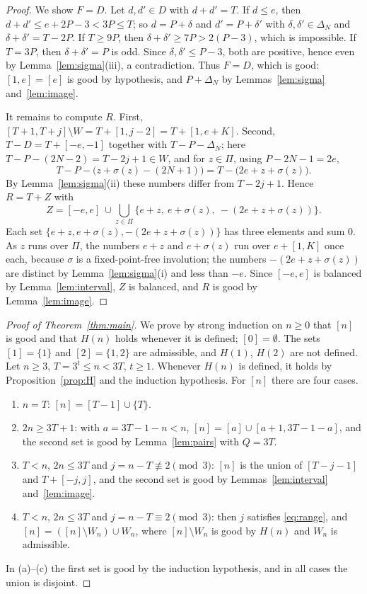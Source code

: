 \documentclass[preprint,12pt]{elsarticle}
\theoremstyle{definition}
\newcommand{\iv}[2]{[#1,#2]}
\begin{document}
\begin{proof}
We show $F=D$. Let $d,d'\in D$ with $d+d'=T$. If $d\le e$, then $d+d'\le e+2P-3<3P\le T$; so $d=P+\delta$ and $d'=P+\delta'$ with $\delta,\delta'\in\Delta_N$ and $\delta+\delta'=T-2P$. If $T\ge9P$, then $\delta+\delta'\ge7P>2(P-3)$, which is impossible. If $T=3P$, then $\delta+\delta'=P$ is odd. Since $\delta,\delta'\le P-3$, both are positive, hence even by Lemma~\ref{lem:sigma}(iii), a contradiction. Thus $F=D$, which is good: $\iv1e=[e]$ is good by hypothesis, and $P+\Delta_N$ by Lemmas~\ref{lem:sigma} and~\ref{lem:image}.

It remains to compute $R$. First, $\iv{T+1}{T+j}\setminus W=T+\iv1{j-2}=T+\iv1{e+K}$. Second, $T-D=T+\iv{-e}{-1}$ together with $T-P-\Delta_N$; here $T-P-(2N-2)=T-2j+1\in W$, and for $z\in\Pi$, using $P-2N-1=2e$,
\[
T-P-\bigl(z+\sigma(z)-(2N+1)\bigr)=T-\bigl(2e+z+\sigma(z)\bigr).
\]
By Lemma~\ref{lem:sigma}(ii) these numbers differ from $T-2j+1$. Hence $R=T+Z$ with
\[
Z=\iv{-e}{e}\ \cup\bigcup_{z\in\Pi}\bigl\{e+z,\ e+\sigma(z),\ -(2e+z+\sigma(z))\bigr\}.
\]
Each set $\{e+z,e+\sigma(z),-(2e+z+\sigma(z))\}$ has three elements and sum $0$. As $z$ runs over $\Pi$, the numbers $e+z$ and $e+\sigma(z)$ run over $e+\iv1K$ once each, because $\sigma$ is a fixed-point-free involution; the numbers $-(2e+z+\sigma(z))$ are distinct by Lemma~\ref{lem:sigma}(i) and less than $-e$. Since $\iv{-e}{e}$ is balanced by Lemma~\ref{lem:interval}, $Z$ is balanced, and $R$ is good by Lemma~\ref{lem:image}.
\end{proof}

\begin{proof}[Proof of Theorem~\ref{thm:main}]
We prove by strong induction on $n\ge0$ that $[n]$ is good and that $H(n)$ holds whenever it is defined; $[0]=\emptyset$. The sets $[1]=\{1\}$ and $[2]=\{1,2\}$ are admissible, and $H(1)$, $H(2)$ are not defined. Let $n\ge3$, $T=3^t\le n<3T$, $t\ge1$. Whenever $H(n)$ is defined, it holds by Proposition~\ref{prop:H} and the induction hypothesis. For $[n]$ there are four cases.
\begin{enumerate}
\item[(a)] $n=T$: $[n]=[T-1]\cup\{T\}$.
\item[(b)] $2n\ge3T+1$: with $a=3T-1-n<n$, $[n]=[a]\cup\iv{a+1}{3T-1-a}$, and the second set is good by Lemma~\ref{lem:pairs} with $Q=3T$.
\item[(c)] $T<n$, $2n\le3T$ and $j=n-T\not\equiv2\pmod3$: $[n]$ is the union of $[T-j-1]$ and $T+\iv{-j}{j}$, and the second set is good by Lemmas~\ref{lem:interval} and~\ref{lem:image}.
\item[(d)] $T<n$, $2n\le3T$ and $j=n-T\equiv2\pmod3$: then $j$ satisfies \eqref{eq:range}, and $[n]=([n]\setminus W_n)\cup W_n$, where $[n]\setminus W_n$ is good by $H(n)$ and $W_n$ is admissible.
\end{enumerate}
In (a)--(c) the first set is good by the induction hypothesis, and in all cases the union is disjoint.
\end{proof}
\end{document}
